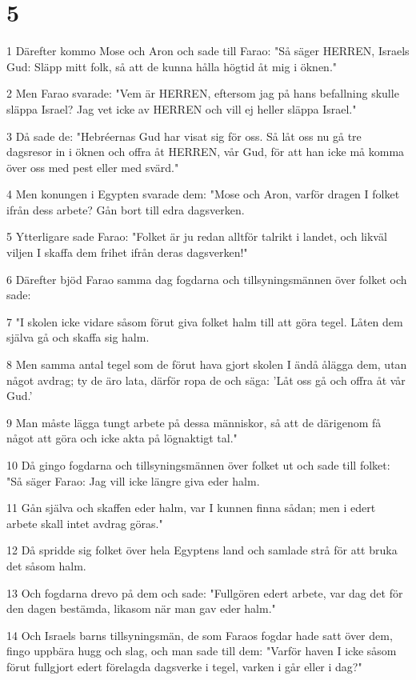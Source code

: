 \chapter{5}

\par 1 Därefter kommo Mose och Aron och sade till Farao: "Så säger HERREN, Israels Gud: Släpp mitt folk, så att de kunna hålla högtid åt mig i öknen."
\par 2 Men Farao svarade: "Vem är HERREN, eftersom jag på hans befallning skulle släppa Israel? Jag vet icke av HERREN och vill ej heller släppa Israel."
\par 3 Då sade de: "Hebréernas Gud har visat sig för oss. Så låt oss nu gå tre dagsresor in i öknen och offra åt HERREN, vår Gud, för att han icke må komma över oss med pest eller med svärd."
\par 4 Men konungen i Egypten svarade dem: "Mose och Aron, varför dragen I folket ifrån dess arbete? Gån bort till edra dagsverken.
\par 5 Ytterligare sade Farao: "Folket är ju redan alltför talrikt i landet, och likväl viljen I skaffa dem frihet ifrån deras dagsverken!"
\par 6 Därefter bjöd Farao samma dag fogdarna och tillsyningsmännen över folket och sade:
\par 7 "I skolen icke vidare såsom förut giva folket halm till att göra tegel. Låten dem själva gå och skaffa sig halm.
\par 8 Men samma antal tegel som de förut hava gjort skolen I ändå ålägga dem, utan något avdrag; ty de äro lata, därför ropa de och säga: 'Låt oss gå och offra åt vår Gud.'
\par 9 Man måste lägga tungt arbete på dessa människor, så att de därigenom få något att göra och icke akta på lögnaktigt tal."
\par 10 Då gingo fogdarna och tillsyningsmännen över folket ut och sade till folket: "Så säger Farao: Jag vill icke längre giva eder halm.
\par 11 Gån själva och skaffen eder halm, var I kunnen finna sådan; men i edert arbete skall intet avdrag göras."
\par 12 Då spridde sig folket över hela Egyptens land och samlade strå för att bruka det såsom halm.
\par 13 Och fogdarna drevo på dem och sade: "Fullgören edert arbete, var dag det för den dagen bestämda, likasom när man gav eder halm."
\par 14 Och Israels barns tillsyningsmän, de som Faraos fogdar hade satt över dem, fingo uppbära hugg och slag, och man sade till dem: "Varför haven I icke såsom förut fullgjort edert förelagda dagsverke i tegel, varken i går eller i dag?"
